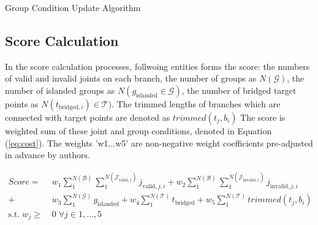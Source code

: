 \begin{algorithm}
  \caption{Group Condition Update Algorithm}
  \begin{algorithmic}[1]
    \EndIf

            \EndIf
            \EndIf
          \EndIf
        \EndFor
      \EndFor

      \EndIf
    \EndFor

  \EndFunction
  \end{algorithmic}
  \label{al:connection}
\end{algorithm}

\subsection{Score Calculation}
In the score calculation processes, follwoing entities forms the score: the numbers of valid and invalid joints on each branch, the number of groups as $N(\mathcal{G} )$, the number of islanded groups as $N(g_{\text{islanded}} \in \mathcal{G} )$, the number of bridged target points as $N(t_{\text{bridged}, i}) \in \mathcal{T} )$.
The trimmed lengths of branches which are connected with target points are denoted as $trimmed(t_j, b_i)$
The score is weighted sum of these joint and group conditions, denoted in Equation (\ref{eq:cost}).
The weights 'w1...w5' are non-negative weight coefficients pre-adjusted in advance by authors.


\begin{equation} \label{eq:cost}
 \begin{aligned}
 Score =  &\; w_1  \sum_{1}^{N(\mathcal{B})} \sum_{1}^{N(\mathcal{J}_{\text{valid},i})} j_{\text{valid}, j, i}
 + w_2  \sum_{1}^{N(\mathcal{B})} \sum_{1}^{N(\mathcal{J}_{\text{invalid},i})} j_{\text{invalid}, j, i}\\
+ &\; w_3  \sum_{1}^{N(\mathcal{G})} g_{\text{islanded}}
	 + w_4  \sum_{1}^{N(\mathcal{T})} t_{\text{bridged}}
+  w_5 \sum_{1}^{N(\mathcal{T})} trimmed(t_j, b_i)
 \\
   \textrm{s.t.} \; w_j  \geq  &\;0 \; \forall j \in 1, \dotsc , 5
 \end{aligned}
\end{equation}
